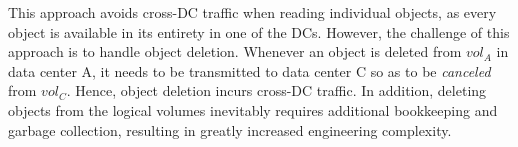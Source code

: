 This approach avoids cross-DC traffic when reading individual objects, as every object is available in its entirety in one of the DCs. However, the challenge of this approach is to handle object deletion. Whenever an object is deleted from $vol_A$ in data center A, it needs to be transmitted to data center C so as to be {\em canceled} from $vol_C$. Hence, object deletion incurs cross-DC traffic. In addition, deleting objects from the logical volumes inevitably requires additional bookkeeping and garbage collection, resulting in greatly increased engineering complexity.


